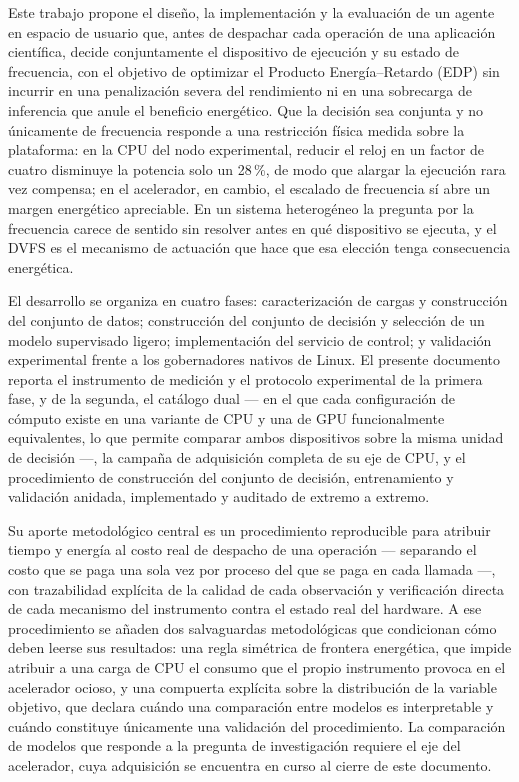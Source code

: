 \documentclass[12pt,oneside,spanish]{book}
\begin{document}
Este trabajo propone el diseño, la implementación y la evaluación de un agente en espacio de usuario que, antes de despachar cada operación de una aplicación científica, decide conjuntamente el dispositivo de ejecución y su estado de frecuencia, con el objetivo de optimizar el Producto Energía--Retardo (EDP) sin incurrir en una penalización severa del rendimiento ni en una sobrecarga de inferencia que anule el beneficio energético. Que la decisión sea conjunta y no únicamente de frecuencia responde a una restricción física medida sobre la plataforma: en la CPU del nodo experimental, reducir el reloj en un factor de cuatro disminuye la potencia solo un 28\,\%, de modo que alargar la ejecución rara vez compensa; en el acelerador, en cambio, el escalado de frecuencia sí abre un margen energético apreciable. En un sistema heterogéneo la pregunta por la frecuencia carece de sentido sin resolver antes en qué dispositivo se ejecuta, y el DVFS es el mecanismo de actuación que hace que esa elección tenga consecuencia energética.

El desarrollo se organiza en cuatro fases: caracterización de cargas y construcción del conjunto de datos; construcción del conjunto de decisión y selección de un modelo supervisado ligero; implementación del servicio de control; y validación experimental frente a los gobernadores nativos de Linux. El presente documento reporta el instrumento de medición y el protocolo experimental de la primera fase, y de la segunda, el catálogo dual --- en el que cada configuración de cómputo existe en una variante de CPU y una de GPU funcionalmente equivalentes, lo que permite comparar ambos dispositivos sobre la misma unidad de decisión ---, la campaña de adquisición completa de su eje de CPU, y el procedimiento de construcción del conjunto de decisión, entrenamiento y validación anidada, implementado y auditado de extremo a extremo.

Su aporte metodológico central es un procedimiento reproducible para atribuir tiempo y energía al costo real de despacho de una operación --- separando el costo que se paga una sola vez por proceso del que se paga en cada llamada ---, con trazabilidad explícita de la calidad de cada observación y verificación directa de cada mecanismo del instrumento contra el estado real del hardware. A ese procedimiento se añaden dos salvaguardas metodológicas que condicionan cómo deben leerse sus resultados: una regla simétrica de frontera energética, que impide atribuir a una carga de CPU el consumo que el propio instrumento provoca en el acelerador ocioso, y una compuerta explícita sobre la distribución de la variable objetivo, que declara cuándo una comparación entre modelos es interpretable y cuándo constituye únicamente una validación del procedimiento. La comparación de modelos que responde a la pregunta de investigación requiere el eje del acelerador, cuya adquisición se encuentra en curso al cierre de este documento.
\end{document}
